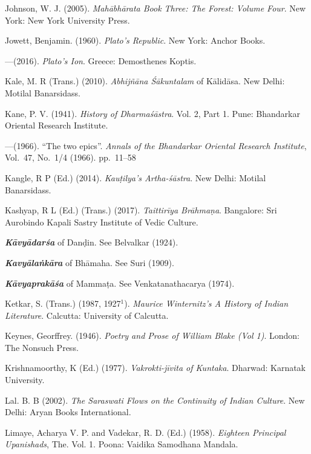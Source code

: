 \begin{thebibliography}{99}
Johnson, W. J. (2005). {\sl Mahābhārata Book Three: The Forest: Volume Four}. New York: New York University Press. 

Jowett, Benjamin. (1960). {\sl Plato’s Republic}. New York: Anchor Books. 

---\kern3pt(2016). {\sl Plato’s Ion}. Greece: Demosthenes Koptis. 

Kale, M. R (Trans.) (2010). {\sl Abhijñāna Śākuntalam} of Kālidāsa. New Delhi: Motilal Banarsidass. 

Kane, P. V. (1941). {\sl History of Dharmaśāstra}. Vol. 2, Part 1. Pune: Bhandarkar Oriental Research Institute. 

---\kern3pt(1966). “The two epics”. {\sl Annals of the Bhandarkar Oriental Research Institute}, Vol.~47, No.~1/4 (1966). pp.~11--58 

Kangle, R P (Ed.) (2014). {\sl Kauṭilya’s Artha-śāstra}. New Delhi: Motilal Banarsidass. 

Kashyap, R L (Ed.) (Trans.) (2017). {\sl Taittirīya Brāhmaṇa}. Bangalore: Sri Aurobindo Kapali Sastry Institute of Vedic Culture. 

{\sl\bfseries Kāvyādarśa} of Danḍin. See Belvalkar (1924).  

{\sl\bfseries Kavyālaṅkāra} of Bhāmaha. See Suri (1909).

{\sl\bfseries Kāvyaprakāśa} of Mammaṭa. See Venkatanathacarya (1974).

Ketkar, S. (Trans.) (1987, 1927$^{1}$).  {\sl Maurice Winternitz’s A History of Indian Literature}. Calcutta: University of Calcutta. 

Keynes, Georffrey. (1946). {\sl Poetry and Prose of William Blake (Vol 1)}. London: The Nonsuch Press. 

Krishnamoorthy, K (Ed.) (1977). {\sl Vakrokti-jīvita of Kuntaka}. Dharwad: Karnatak University. 

Lal. B. B (2002). {\sl The Saraswati Flows on the Continuity of Indian Culture}. New Delhi: Aryan Books International. 

Limaye, Acharya V. P. and Vadekar, R. D. (Ed.) (1958). {\sl Eighteen Principal Upanishads}, The. Vol. 1. Poona: Vaidika Samodhana Mandala.


\end{thebibliography}
